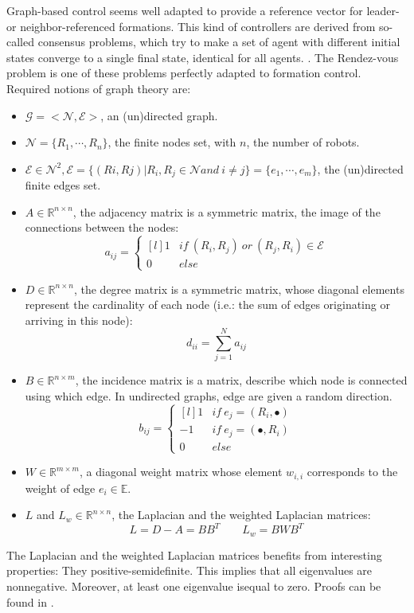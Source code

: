 \documentclass[a4paper, 12pt]{report}
\begin{document}
Graph-based control seems well adapted to provide a reference vector for leader- or neighbor-referenced formations. This kind of controllers are derived from so-called consensus problems, which try to make a set of agent with different initial states converge to a single final state, identical for all agents. \cite{Ren2005}. The Rendez-vous problem \cite{Gowal2013} is one of these problems perfectly adapted to formation control. Required notions of graph theory are: 
\begin{itemize}
\item $\mathcal{G} = <\mathcal{N}, \mathcal{E}>$, an (un)directed graph.
\item $\mathcal{N} = \{R_1, \cdots, R_n\}$, the finite nodes set,  with $n$, the number of robots.
\item $\mathcal{E} \in \mathcal{N}^2, \mathcal{E} = \{(Ri,Rj)| R_i, R_j \in \mathcal{N} and\ i \neq j\} = \{e_1, \cdots, e_m\} $, the (un)directed finite edges set.
\item $A \in  \mathbb{R}^{n \times n} $, the adjacency matrix is a symmetric matrix, the image of the connections between the nodes:
\[a_{ij} =  \left\{ \begin{matrix*}[l] 1 & if\ (R_i, R_j)\ or\ (R_j, R_i) \in \mathcal{E} \\ 0 & else \end{matrix*} \right.\]
\item $D \in  \mathbb{R}^{n \times n} $, the degree matrix is a symmetric matrix, whose diagonal elements represent the cardinality of each node (i.e.: the sum of edges originating or arriving in this node):
\[d_{ii} =  \sum_{j=1}^{N} a_{ij}\]
\item $B \in  \mathbb{R}^{n \times m} $, the incidence matrix is a matrix, describe which node is connected using which edge. In undirected graphs, edge are given a random direction.
\[b_{ij} =  \left\{ \begin{matrix*}[l] 1 & if\ e_j = (R_i, \bullet) \\-1 & if\ e_j = (\bullet, R_i)  \\ 0 & else \end{matrix*} \right.\]
\item $W \in \mathbb{R}^{m\times m} $, a diagonal weight matrix whose element $w_{i,i}$ corresponds to the weight of edge $e_i \in \mathbb{E}$.
\item $L$ and $L_w\in \mathbb{R}^{n\times n} $, the Laplacian and the weighted Laplacian matrices:
\[ L = D-A = BB^T \qquad L_w = BWB^T\]
\end{itemize}  
The Laplacian and the weighted Laplacian matrices benefits from interesting properties: They positive-semidefinite. This implies that all eigenvalues are nonnegative. Moreover, at least one eigenvalue isequal to zero. Proofs can be found in \cite{Gowal2013}. 
\end{document}
